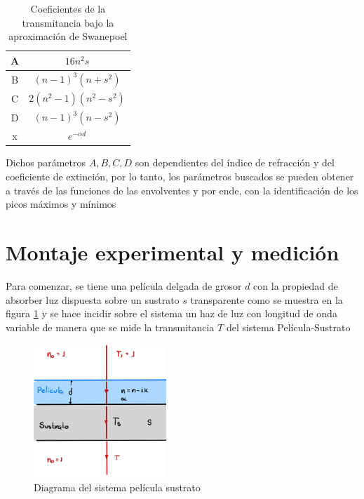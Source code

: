 \documentclass[article]{article}
\begin{document}
\begin{multicols}{2}
    \begin{table}[H]
        \centering
        \begin{tabular}{|c|c|}
        \hline
            A & $16n^2 s$  \\
            \hline
            B & $(n-1)^3(n+s^2)$\\
            \hline
            C & $2(n^2-1)(n^2-s^2)$\\
            \hline
            D & $(n-1)^3(n-s^2)$\\
            \hline
            x & $e^{-\alpha d}$\\
            \hline
        \end{tabular}
        \caption{Coeficientes de la transmitancia bajo la aproximación de Swanepoel}
        \label{Tab: Coeficientes transmitancia}
    \end{table}
    
    
    Dichos parámetros $A,B,C,D$ son dependientes del índice de refracción y del coeficiente de extinción, por lo tanto, los parámetros buscados se pueden obtener a través de las funciones de las envolventes y por ende, con la identificación de los picos máximos y mínimos
    
    \section{Montaje experimental y medición}
    
    Para comenzar, se tiene una película delgada de grosor $d$ con la propiedad de absorber luz dispuesta sobre un sustrato $s$ transparente como se muestra en la figura \ref{Fig: Diagrama Sustrato} y se hace incidir sobre el sistema un haz de luz con longitud de onda variable de manera que se mide la transmitancia $T$ del sistema Película-Sustrato 
    
    \begin{figure}[H]
    \centering
    \includegraphics[width= 5cm]{Diagrama Sistema.JPG}
    \caption{Diagrama del sistema película sustrato}
    \label{Fig: Diagrama Sustrato}
    \end{figure}
    

\end{multicols}
\end{document}
